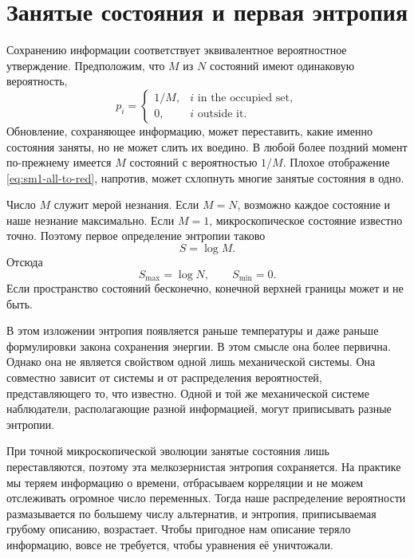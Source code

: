 \section{Занятые состояния и первая энтропия}

Сохранению информации соответствует эквивалентное вероятностное утверждение. Предположим, что \(M\) из \(N\) состояний имеют одинаковую вероятность,
\begin{equation}
 p_i=
 \begin{cases}
 1/M, & i\text{ in the occupied set},\\
 0, & i\text{ outside it}.
 \end{cases}
 \label{eq:sm1-uniform-occupied}
\end{equation}
Обновление, сохраняющее информацию, может переставить, какие именно состояния заняты, но не может слить их воедино. В любой более поздний момент по-прежнему имеется \(M\) состояний с вероятностью \(1/M\). Плохое отображение \eqref{eq:sm1-all-to-red}, напротив, может схлопнуть многие занятые состояния в одно.

Число \(M\) служит мерой незнания. Если \(M=N\), возможно каждое состояние и наше незнание максимально. Если \(M=1\), микроскопическое состояние известно точно. Поэтому первое определение энтропии таково
\begin{equation}
 S=\log M.
 \label{eq:sm1-entropy-logm}
\end{equation}
Отсюда
\begin{equation}
 S_{\max}=\log N,
 \qquad
 S_{\min}=0.
\end{equation}
Если пространство состояний бесконечно, конечной верхней границы может и не быть.

В этом изложении энтропия появляется раньше температуры и даже раньше формулировки закона сохранения энергии. В этом смысле она более первична. Однако она не является свойством одной лишь механической системы. Она совместно зависит от системы и от распределения вероятностей, представляющего то, что известно. Одной и той же механической системе наблюдатели, располагающие разной информацией, могут приписывать разные энтропии.

При точной микроскопической эволюции занятые состояния лишь переставляются, поэтому эта мелкозернистая энтропия сохраняется. На практике мы теряем информацию о времени, отбрасываем корреляции и не можем отслеживать огромное число переменных. Тогда наше распределение вероятности размазывается по большему числу альтернатив, и энтропия, приписываемая грубому описанию, возрастает. Чтобы пригодное нам описание теряло информацию, вовсе не требуется, чтобы уравнения её уничтожали.

